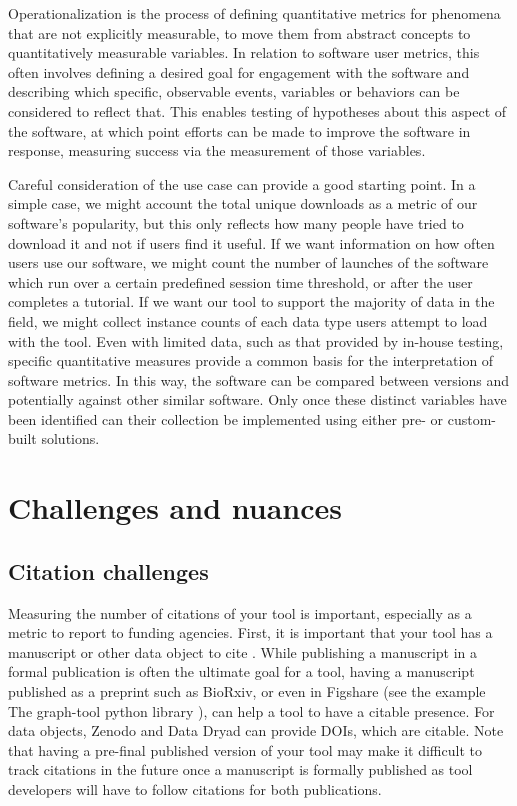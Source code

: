 \documentclass{article}
\begin{document}
Operationalization is the process of defining quantitative metrics for phenomena that are not explicitly measurable, to move them from abstract concepts to quantitatively measurable variables. In relation to software user metrics, this often involves defining a desired goal for engagement with the software and describing which specific, observable events, variables or behaviors can be considered to reflect that. This enables testing of hypotheses about this aspect of the software, at which point efforts can be made to improve the software in response, measuring success via the measurement of those variables. 

Careful consideration of the use case can provide a good starting point. In a simple case, we might account the total unique downloads as a metric of our software’s popularity, but this only reflects how many people have tried to download it and not if users find it useful. If we want information on how often users use our software, we might count the number of launches of the software which run over a certain predefined session time threshold, or after the user completes a tutorial. If we want our tool to support the majority of data in the field, we might collect instance counts of each data type users attempt to load with the tool. Even with limited data, such as that provided by in-house testing, specific quantitative measures provide a common basis for the interpretation of software metrics. In this way, the software can be compared between versions and potentially against other similar software. Only once these distinct variables have been identified can their collection be implemented using either pre- or custom-built solutions.

\section{Challenges and nuances}

\subsection{Citation challenges}
Measuring the number of citations of your tool is important, especially as a metric to report to funding agencies. First, it is important that your tool has a manuscript or other data object to cite \cite{chue_hong_software_2019}. While publishing a manuscript in a formal publication is often the ultimate goal for a tool, having a manuscript published as a preprint such as BioRxiv, or even in Figshare (see the example The graph-tool python library \cite{peixoto_graph-tool_2017}), can help a tool to have a citable presence. For data objects, Zenodo and Data Dryad can provide DOIs, which are citable. Note that having a pre-final published version of your tool may make it difficult to track citations in the future once a manuscript is formally published as tool developers will have to follow citations for both publications.
\end{document}
